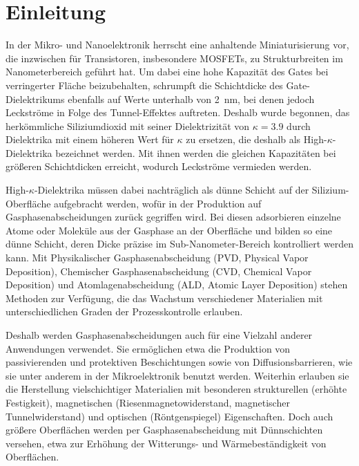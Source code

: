 \chapter{Einleitung}
\label{intro}

In der Mikro- und Nanoelektronik herrscht eine anhaltende Miniaturisierung vor, die inzwischen für Transistoren, insbesondere MOSFETs, zu Strukturbreiten im Nanometerbereich geführt hat.
Um dabei eine hohe Kapazität des Gates bei verringerter Fläche beizubehalten, schrumpft die Schichtdicke des Gate-Dielektrikums ebenfalls auf Werte unterhalb von \SI{2}{\nano\meter}, bei denen jedoch Leckströme in Folge des Tunnel-Effektes auftreten.
Deshalb wurde begonnen, das herkömmliche Siliziumdioxid mit seiner Dielektrizität von $\kappa=\num{3.9}$ durch Dielektrika mit einem höheren Wert für $\kappa$ zu ersetzen, die deshalb als High-$\kappa$-Dielektrika bezeichnet werden.
Mit ihnen werden die gleichen Kapazitäten bei größeren Schichtdicken erreicht, wodurch Leckströme vermieden werden.


High-$\kappa$-Dielektrika müssen dabei nachträglich als dünne Schicht auf der Silizium-Oberfläche aufgebracht werden, wofür in der Produktion auf Gasphasenabscheidungen zurück gegriffen wird.
Bei diesen adsorbieren einzelne Atome oder Moleküle aus der Gasphase an der Oberfläche und bilden so eine dünne Schicht, deren Dicke präzise im Sub-Nanometer-Bereich kontrolliert werden kann.
Mit Physikalischer Gasphasenabscheidung (PVD, Physical Vapor Deposition), Chemischer Gasphasenabscheidung (CVD, Chemical Vapor Deposition) und Atomlagenabscheidung (ALD, Atomic Layer Deposition) stehen Methoden zur Verfügung, die das Wachstum verschiedener Materialien mit unterschiedlichen Graden der Prozesskontrolle erlauben.

Deshalb werden Gasphasenabscheidungen auch für eine Vielzahl anderer Anwendungen verwendet.
Sie ermöglichen etwa die Produktion von passivierenden und protektiven Beschichtungen sowie von Diffusionsbarrieren, wie sie unter anderem in der Mikroelektronik benutzt werden.
Weiterhin erlauben sie die Herstellung vielschichtiger Materialien mit besonderen strukturellen (erhöhte Festigkeit), magnetischen (Riesenmagnetowiderstand, magnetischer Tunnelwiderstand) und optischen (Röntgenspiegel) Eigenschaften.
Doch auch größere Oberflächen werden per Gasphasenabscheidung mit Dünnschichten versehen, etwa zur Erhöhung der Witterungs- und Wärmebeständigkeit von Oberflächen.


